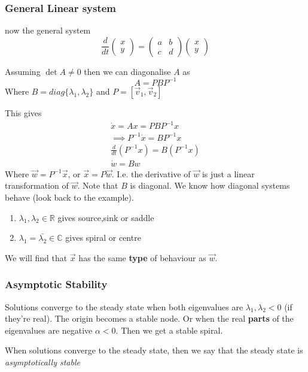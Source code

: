 \documentclass{X:/Documents/Coding/Latex/myassignment}
\begin{document}
\subsubsection{General Linear system}
now the general system
\[\frac{d}{dt} \begin{pmatrix}
    x\\y
\end{pmatrix} = \begin{pmatrix}
a&b\\c&d
\end{pmatrix} \begin{pmatrix}
    x\\y
\end{pmatrix}\]

Assuming $\det A\neq 0$ then we can diagonalise $A$ as
\[A = PBP^{-1}\]
Where $B = diag\{\lambda_1,\lambda_2\}$ and $P = [\vec v_1,\vec v_2]$ 

This gives
\begin{align*}
    \dot x = Ax = PBP^{-1} x\\
    \implies P^{-1} \dot x = BP^{-1} x\\
    \frac{d}{dt}(P^{-1} x) = B (P^{-1} x)\\
    \dot w = B w
\end{align*}
Where $\vec w = P^{-1} \vec x$, or $\vec x = P\vec w$. I.e. the derivative of $\vec w$ is just a linear transformation of $\vec w$.
Note that $B$ is diagonal. We know how diagonal systems behave (look back to the example). 

\begin{enumerate}
    \item $\lambda_1,\lambda_2 \in \mathbb{R}$ gives source,sink or saddle
    \item $\lambda_1 = \bar{\lambda_2} \in \mathbb{C}$ gives spiral or centre
\end{enumerate}

We will find that $\vec x$ has the same \textbf{type} of behaviour as $\vec w$.


\subsubsection{Asymptotic Stability}
Solutions converge to the steady state when both eigenvalues are $\lambda_1,\lambda_2 < 0$ (if they're real). The origin becomes a stable node.
Or when the real \textbf{parts} of the eigenvalues are negative $\alpha <0$. Then we get a stable spiral.

When solutions converge to the steady state, then we say that the steady state is \textit{asymptotically stable}
\end{document}
